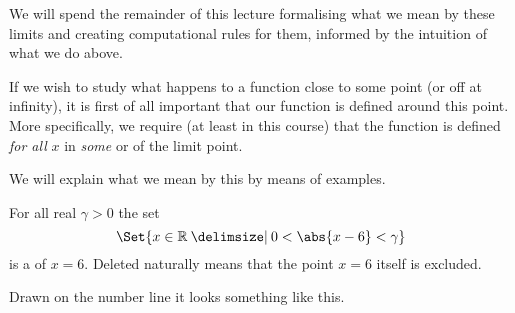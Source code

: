We will spend the remainder of this lecture formalising what we mean by these limits and creating computational rules for them, informed by the intuition of what we do above.


If we wish to study what happens to a function close to some point (or off at infinity), it is first of all important that our function is defined around this point. More specifically, we require (at least in this course) that the function is defined \emph{for all} $x$ in \emph{some}  or  of the limit point.

We will explain what we mean by this by means of examples.

\begin{example}
	For all real $\gamma > 0$ the set
	\[
		\Set{x \in \R \given 0 < \abs{x - 6} < \gamma}
	\]
	is a  of $x = 6$. Deleted naturally means that the point $x = 6$ itself is excluded.

	Drawn on the number line it looks something like this.

	\begin{figure}[H]
		\centering
	\end{figure}
\end{example}

